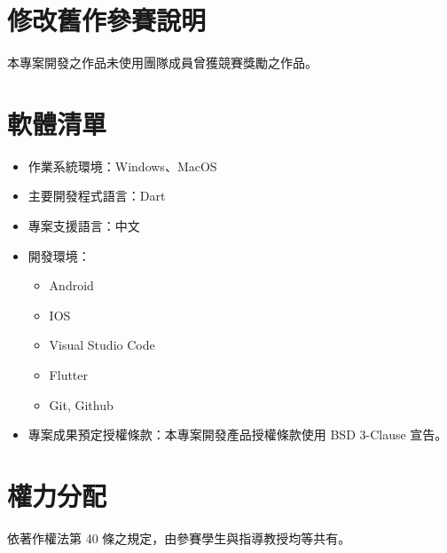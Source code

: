 \documentclass[12pt]{article}
\begin{document}
    

\section{修改舊作參賽說明}
  本專案開發之作品未使用團隊成員曾獲競賽獎勵之作品。
\section{軟體清單}
\begin{itemize}
  \item 作業系統環境：Windows、MacOS
  \item 主要開發程式語言：Dart
  \item 專案支援語言：中文
  \item 開發環境：
  \begin{itemize}
    \item Android
    \item IOS
    \item Visual Studio Code
    \item Flutter
    \item Git, Github
  \end{itemize}
  \item 專案成果預定授權條款：本專案開發產品授權條款使用 BSD 3-Clause 宣告。
\end{itemize}

\section{權力分配}
依著作權法第 40 條之規定，由參賽學生與指導教授均等共有。
\end{document}
